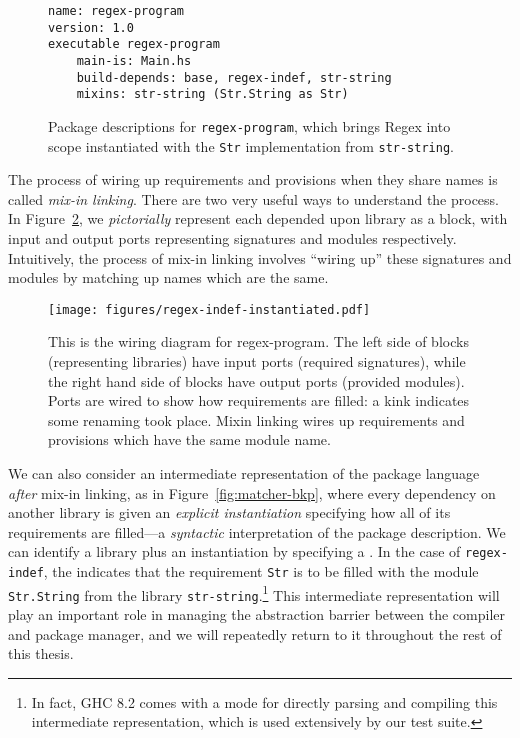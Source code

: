 \begin{figure}
\begin{lstlisting}[language=Cabal]
name: regex-program
version: 1.0
executable regex-program
    main-is: Main.hs
    build-depends: base, regex-indef, str-string
    mixins: str-string (Str.String as Str)
\end{lstlisting}
\caption{Package descriptions for \texttt{regex-program}, which brings
Regex into scope instantiated with the \texttt{Str} implementation from \texttt{str-string}.}
\label{fig:matcher-functorized-packages}
\end{figure}

The process of wiring up requirements and provisions when they share names
is called \emph{mix-in linking}.  There are two very useful
ways to understand the process.  In Figure~\ref{fig:regex-indef-instantiated}, we
\emph{pictorially} represent each depended upon library as a block, with input and output
ports representing signatures and modules respectively.  Intuitively, the process
of mix-in linking involves ``wiring up'' these signatures and modules by matching
up names which are the same.

\begin{figure}
\center%
\texttt{[image: figures/regex-indef-instantiated.pdf]}
\caption{This is the wiring diagram for regex-program. The left side of blocks
(representing libraries) have input ports (required signatures), while the right hand side
of blocks have output ports (provided modules). Ports are wired to show how requirements are
filled: a kink indicates some renaming took place. Mixin linking wires up requirements
and provisions which have the same module name.}
\label{fig:regex-indef-instantiated}
\end{figure}

We can also consider an intermediate representation of the package language
\emph{after} mix-in linking,
as in Figure~\ref{fig:matcher-bkp}, where every dependency on another library
is given an \emph{explicit instantiation} specifying how all of its requirements
are filled---a \emph{syntactic} interpretation of
the package description. We can identify a library plus an instantiation by
specifying a \emph{\uid{}}.  In the case of \verb|regex-indef|, the
\uid{} indicates that the requirement \verb|Str| is to be filled
with the module \verb|Str.String| from the library \verb|str-string|.\footnote{In
fact, GHC 8.2 comes with a mode for directly parsing and compiling this intermediate
representation, which is used extensively by our test suite.}  This intermediate
representation will play an important role in managing the abstraction barrier
between the compiler and package manager, and we will repeatedly return to
it throughout the rest of this thesis.

